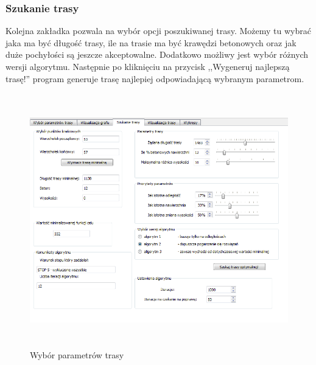 \documentclass[12pt,a4paper]{article}
\begin{document}
\subsubsection{Szukanie trasy}
Kolejna zakładka pozwala na wybór opcji poszukiwanej trasy. Możemy tu wybrać jaka ma być długość trasy, ile na trasie ma być krawędzi betonowych oraz jak duże pochyłości są jeszcze akceptowalne. Dodatkowo możliwy jest wybór różnych wersji algorytmu. Następnie po kliknięciu na przycisk ,,Wygeneruj najlepszą trasę!'' program generuje trasę najlepiej odpowiadającą wybranym parametrom.
\begin{figure}[!h]
	\centering
	\includegraphics[height=110mm]{./ilustracje/screen3.png}
	\caption{Wybór parametrów trasy}
\end{figure}
\end{document}
